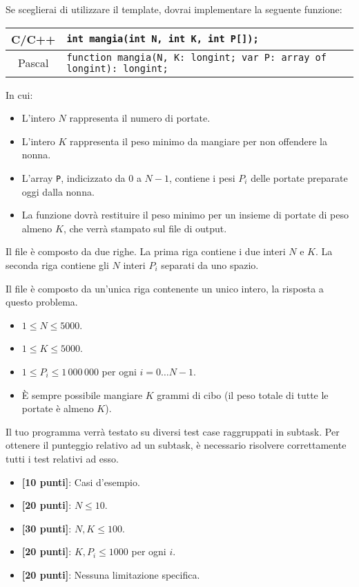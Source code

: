 Se sceglierai di utilizzare il template, dovrai implementare la seguente funzione:
\begin{center}\begin{tabularx}{\textwidth}{|c|X|}
\hline
C/C++  & \verb|int mangia(int N, int K, int P[]);|\\
\hline
Pascal & \verb|function mangia(N, K: longint; var P: array of longint): longint;|\\
\hline
\end{tabularx}\end{center}
In cui:
\begin{itemize}[nolistsep]
  \item L'intero $N$ rappresenta il numero di portate.
  \item L'intero $K$ rappresenta il peso minimo da mangiare per non offendere la nonna.
  \item L'array \texttt{P}, indicizzato da $0$ a $N-1$, contiene i pesi $P_i$ delle portate preparate oggi dalla nonna.
  \item La funzione dovrà restituire il peso minimo per un insieme di portate di peso almeno $K$, che verrà stampato sul file di output.
\end{itemize}

\InputFile
Il file  è composto da due righe. La prima riga contiene i due interi $N$ e $K$. La seconda riga contiene gli $N$ interi $P_i$ separati da uno spazio.

\OutputFile
Il file \outputfile{} è composto da un'unica riga contenente un unico intero, la risposta a questo problema.

\pagebreak
\Constraints
\begin{itemize}[nolistsep, itemsep=2mm]
	\item $1 \le N \le 5000$.
	\item $1 \le K \le 5000$.
	\item $1 \le P_i \le 1\,000\,000$ per ogni $i=0\ldots N-1$.
	\item È sempre possibile mangiare $K$ grammi di cibo (il peso totale di tutte le portate è almeno $K$).
\end{itemize}

\Scoring
Il tuo programma verrà testato su diversi test case raggruppati in subtask.
Per ottenere il punteggio relativo ad un subtask, è necessario risolvere
correttamente tutti i test relativi ad esso.

\begin{itemize}[nolistsep,itemsep=2mm]
  \item \textbf{ [10 punti]}: Casi d'esempio.
  \item \textbf{ [20 punti]}: $N \leq 10$.
  \item \textbf{ [30 punti]}: $N, K \leq 100$.
  \item \textbf{ [20 punti]}: $K, P_i \leq 1000$ per ogni $i$.
  \item \textbf{ [20 punti]}: Nessuna limitazione specifica.
\end{itemize}

